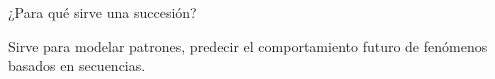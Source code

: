 
\question ¿Para qué sirve una succesión?
  \begin{solution}[2cm]
    Sirve para modelar patrones, predecir el comportamiento futuro de
    fenómenos basados en secuencias.
  \end{solution}
